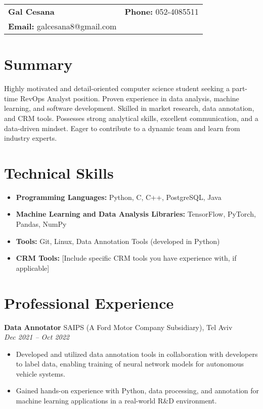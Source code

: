 \documentclass[a4paper,10pt]{article}
\makeatletter
\renewcommand{\maketitle}{
    \hspace{-1em}\begin{tabular*}{\textwidth}{l@{\extracolsep{\fill}}r}
        \textbf{\LARGE Gal Cesana} & \textbf{Phone:} 052-4085511 \\
        \textbf{Email:} galcesana8@gmail.com & \\
    \end{tabular*}
    \vspace{1em}
}
\makeatother
\begin{document}
\maketitle

\section*{Summary}
Highly motivated and detail-oriented computer science student seeking a part-time RevOps Analyst position. Proven experience in data analysis, machine learning, and software development. Skilled in market research, data annotation, and CRM tools.  Possesses strong analytical skills, excellent communication, and a data-driven mindset. Eager to contribute to a dynamic team and learn from industry experts.

\section*{Technical Skills}
\begin{itemize}[noitemsep,nolistsep]
    \item \textbf{Programming Languages:} Python, C, C++, PostgreSQL, Java
    \item \textbf{Machine Learning and Data Analysis Libraries:} TensorFlow, PyTorch, Pandas, NumPy
    \item \textbf{Tools:} Git, Linux, Data Annotation Tools (developed in Python)
    \item \textbf{CRM Tools:} [Include specific CRM tools you have experience with, if applicable]
\end{itemize}

\section*{Professional Experience}
\textbf{Data Annotator} \hfill SAIPS (A Ford Motor Company Subsidiary), Tel Aviv \\
\textit{Dec 2021 -- Oct 2022}
\begin{itemize}[noitemsep,nolistsep]
    \item Developed and utilized data annotation tools in collaboration with developers to label data, enabling training of neural network models for autonomous vehicle systems.
    \item Gained hands-on experience with Python, data processing, and annotation for machine learning applications in a real-world R\&D environment.
\end{itemize}
\end{document}
